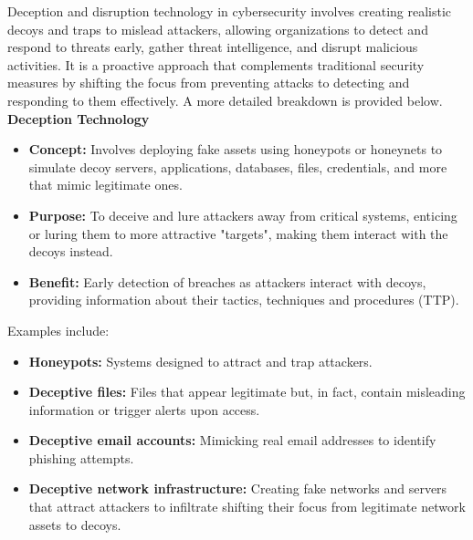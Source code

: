  Deception and disruption technology in cybersecurity involves creating realistic decoys and traps to mislead attackers, allowing organizations to detect and respond to threats early, gather threat intelligence, and disrupt malicious activities. It is a proactive approach that complements traditional security measures by shifting the focus from preventing attacks to detecting and responding to them effectively. A more detailed breakdown is provided below.
\textbf{Deception Technology}
\begin{itemize}
    \item \textbf{Concept:} Involves deploying fake assets using honeypots or honeynets to simulate decoy servers, applications, databases, files, credentials, and more that mimic legitimate ones.
    \item \textbf{Purpose:} To deceive and lure attackers away from critical systems, enticing or luring them to more attractive "targets", making them interact with the decoys instead.
    \item \textbf{Benefit:} Early detection of breaches as attackers interact with decoys, providing information about their tactics, techniques and procedures (TTP).
\end{itemize}
Examples include:
\begin{itemize}
    \item \textbf{Honeypots:} Systems designed to attract and trap attackers.
    \item \textbf{Deceptive files:} Files that appear legitimate but, in fact, contain misleading information or trigger alerts upon access.
    \item \textbf{Deceptive email accounts:} Mimicking real email addresses to identify phishing attempts.
    \item \textbf{Deceptive network infrastructure:} Creating fake networks and servers that attract attackers to infiltrate shifting their focus from legitimate network assets to decoys.
\end{itemize}

